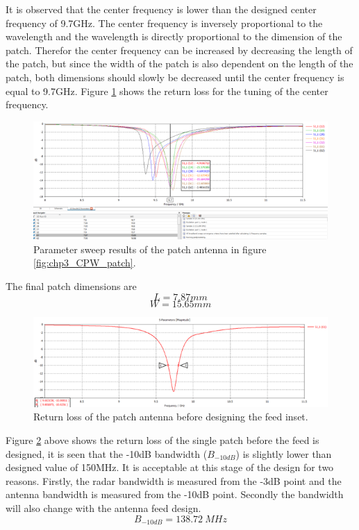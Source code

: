 It is observed that the center frequency is lower than the designed center frequency of 9.7GHz. The center frequency is inversely proportional to the wavelength and the wavelength is directly proportional to the dimension of the patch. Therefor the center frequency can be increased by decreasing the length of the patch, but since the width of the patch is also dependent on the length of the patch, both dimensions should slowly be decreased until the center frequency is equal to 9.7GHz. Figure \ref{fig:chp3_CPW_patch_sweep_results} shows the return loss for the tuning of the center frequency. 

    \begin{figure}[H]
    \centering
    \includegraphics[width=0.95\linewidth]{Figures/chp3_CPW_patch_sweep_results.png}
    \caption{Parameter sweep results of the patch antenna in figure \ref{fig:chp3_CPW_patch}.}
    \label{fig:chp3_CPW_patch_sweep_results}
    \end{figure}

The final patch dimensions are
\[L=7.87mm\]
\[W=15.65mm\]

    \begin{figure}[H]
    \centering
    \includegraphics[width=0.95\linewidth]{Figures/chp3_CPW_patch_tuned_results.png}
    \caption{Return loss of the patch antenna before designing the feed inset.}
    \label{fig:chp3_CPW_patch_tuned_results}
    \end{figure}

Figure \ref{fig:chp3_CPW_patch_tuned_results} above shows the return loss of the single patch before the feed is designed, it is seen that the -10dB bandwidth (\(B_{-10dB}\)) is slightly lower than designed value of 150MHz. It is acceptable at this stage of the design for two reasons. Firstly, the radar bandwidth is measured from the -3dB point and the antenna bandwidth is measured from the -10dB point. Secondly the bandwidth will also change with the antenna feed design.
    \[B_{-10dB}=138.72\ MHz\]

